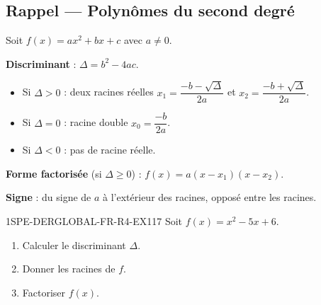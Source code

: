 

\subsection*{Rappel — Polynômes du second degré}

Soit $f(x) = ax^2 + bx + c$ avec $a
\neq 0$.

\textbf{Discriminant} : $\Delta = b^2 - 4ac$.
\begin{itemize}
  \item Si $\Delta > 0$ : deux racines réelles $x_1 = \dfrac{-b - \sqrt{\Delta}}{2a}$ et $x_2 = \dfrac{-b + \sqrt{\Delta}}{2a}$.
  \item Si $\Delta = 0$ : racine double $x_0 = \dfrac{-b}{2a}$.
  \item Si $\Delta < 0$ : pas de racine réelle.
\end{itemize}

\textbf{Forme factorisée} (si $\Delta \geqslant 0$) : $f(x) = a(x - x_1)(x - x_2)$.

\textbf{Signe} : du signe de $a$ à l'extérieur des racines, opposé entre les racines.


\begin{exercice}{1SPE-DERGLOBAL-FR-R4-EX1}{1}{7}
Soit $f(x) = x^2 - 5x + 6$.
\begin{enumerate}
  \item Calculer le discriminant $\Delta$.
  \item Donner les racines de $f$.
  \item Factoriser $f(x)$.
\end{enumerate}
\end{exercice}


